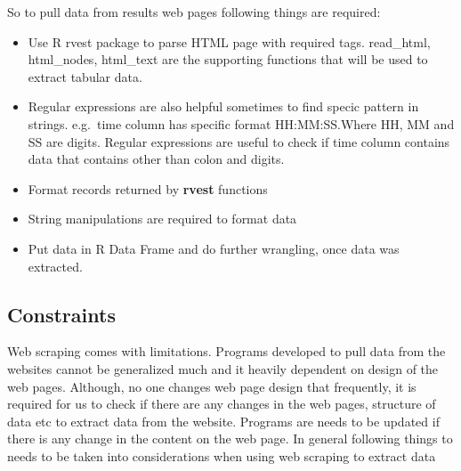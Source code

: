 \documentclass[
]{article}
\providecommand{\tightlist}{%
  \setlength{\itemsep}{0pt}\setlength{\parskip}{0pt}}
\begin{document}
So to pull data from results web pages following things are required:

\begin{itemize}
\tightlist
\item
  Use R rvest package to parse HTML page with required tags. read\_html,
  html\_nodes, html\_text are the supporting functions that will be used
  to extract tabular data.
\item
  Regular expressions are also helpful sometimes to find specic pattern
  in strings. e.g.~time column has specific format HH:MM:SS.Where HH, MM
  and SS are digits. Regular expressions are useful to check if time
  column contains data that contains other than colon and digits.
\item
  Format records returned by \textbf{rvest} functions
\item
  String manipulations are required to format data
\item
  Put data in R Data Frame and do further wrangling, once data was
  extracted.
\end{itemize}

\hypertarget{constraints}{%
\subsection{Constraints}\label{constraints}}

Web scraping comes with limitations. Programs developed to pull data
from the websites cannot be generalized much and it heavily dependent on
design of the web pages. Although, no one changes web page design that
frequently, it is required for us to check if there are any changes in
the web pages, structure of data etc to extract data from the website.
Programs are needs to be updated if there is any change in the content
on the web page. In general following things to needs to be taken into
considerations when using web scraping to extract data
\end{document}
